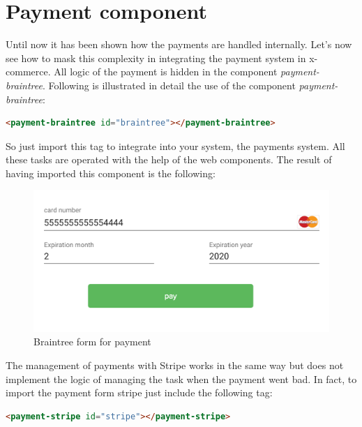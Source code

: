 \section{Payment component}
\label{sec:payment_component}
Until now it has been shown how the payments are handled internally. Let's now see how to mask this complexity in integrating the payment system in x-commerce.
\newline
All logic of the payment is hidden in the component \emph{payment-braintree}.
\newline
Following is illustrated in detail the use of the component \emph{payment-braintree}:
\begin{lstlisting}[language=html]
<payment-braintree id="braintree"></payment-braintree>
\end{lstlisting}
So just import this tag to integrate into your system, the payments system. All these tasks are operated with the help of the web components.
\newline
The result of having imported this component is the following:
\begin{figure}[htb]
 \centering
 \includegraphics[width=0.8\linewidth]{images/chapter5/braintree1.png}\hfill
 \caption[Braintree form]{Braintree form for payment}
 \label{fig:brintree_form1}
\end{figure}
The management of payments with Stripe works in the same way but does not implement the logic of managing the task when the payment went bad. In fact, to import the payment form stripe just include the following tag:
\begin{lstlisting}[language=html]
<payment-stripe id="stripe"></payment-stripe>
\end{lstlisting}